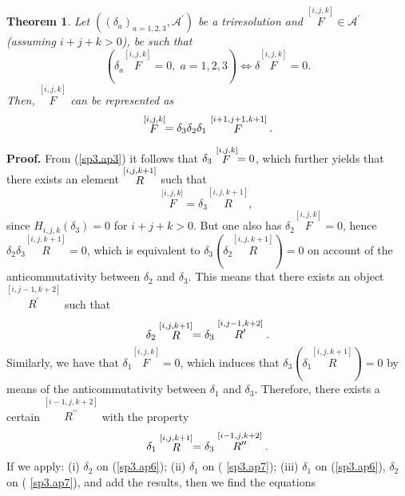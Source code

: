\documentclass[a4paper,12pt]{article}
\newtheorem{theorem}{Theorem}
\begin{document}
\begin{theorem}
Let $\left( \left( \delta _{a}\right) _{a=1,2,3},\mathcal{A}^{\prime
}\right) $ be a triresolution and $\stackrel{[i,j,k]}{F}\in \mathcal{A}%
^{\prime }$ (assuming $i+j+k>0$), be such that 
\begin{equation}
\left( \delta _{a}\stackrel{[i,j,k]}{F}=0,\;a=1,2,3\right) \Leftrightarrow
\delta \stackrel{[i,j,k]}{F}=0.  \label{sp3.ap3}
\end{equation}
Then, $\stackrel{[i,j,k]}{F}$ can be represented as 
\begin{equation}
\stackrel{\lbrack i,j,k]}{F}=\delta _{3}\delta _{2}\delta _{1}\stackrel{%
[i+1,j+1,k+1]}{F}.  \label{sp3.ap4}
\end{equation}
\end{theorem}

{\textbf{Proof.}} From (\ref{sp3.ap3}) it follows that $\delta _{3}\stackrel{%
[i,j,k]}{F}=0$, which further yields that there exists an element $\stackrel{%
[i,j,k+1]}{R}$ such that 
\begin{equation}
\stackrel{\lbrack i,j,k]}{F}=\delta _{3}\stackrel{[i,j,k+1]}{R},
\label{sp3.ap5}
\end{equation}
since $H_{i,j,k}\left( \delta _{3}\right) =0$ for $i+j+k>0$. But one also
has $\delta _{2}\stackrel{[i,j,k]}{F}=0$, hence $\delta _{2}\delta _{3}%
\stackrel{[i,j,k+1]}{R}=0$, which is equivalent to $\delta _{3}\left( \delta
_{2}\stackrel{[i,j,k+1]}{R}\right) =0$ on account of the anticommutativity
between $\delta _{2}$ and $\delta _{3}$. This means that there exists an
object $\stackrel{[i,j-1,k+2]}{R^{\prime }}$ such that 
\begin{equation}
\delta _{2}\stackrel{[i,j,k+1]}{R}=\delta _{3}\stackrel{[i,j-1,k+2]}{%
R^{\prime }}.  \label{sp3.ap6}
\end{equation}
Similarly, we have that $\delta _{1}\stackrel{[i,j,k]}{F}=0$, which induces
that $\delta _{3}\left( \delta _{1}\stackrel{[i,j,k+1]}{R}\right) =0$ by
means of the anticommutativity between $\delta _{1}$ and $\delta _{3}$.
Therefore, there exists a certain $\stackrel{[i-1,j,k+2]}{R^{\prime \prime }}
$ with the property 
\begin{equation}
\delta _{1}\stackrel{[i,j,k+1]}{R}=\delta _{3}\stackrel{[i-1,j,k+2]}{%
R^{\prime \prime }}.  \label{sp3.ap7}
\end{equation}
If we apply: (i) $\delta _{2}$ on (\ref{sp3.ap6}); (ii) $\delta _{1}$ on (%
\ref{sp3.ap7}); (iii) $\delta _{1}$ on (\ref{sp3.ap6}), $\delta _{2}$ on (%
\ref{sp3.ap7}), and add the results, then we find the equations 
\end{document}
